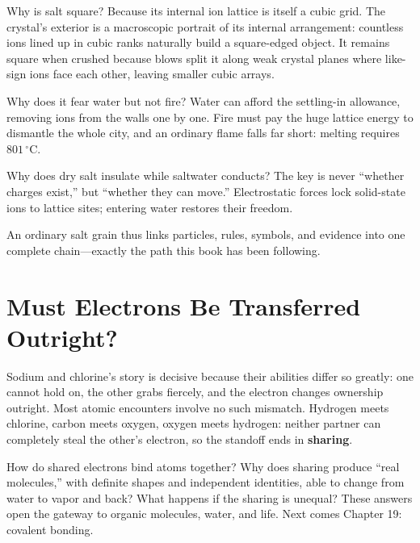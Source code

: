Why is salt square? Because its internal ion lattice is itself a cubic grid. The crystal's exterior is a macroscopic portrait of its internal arrangement: countless ions lined up in cubic ranks naturally build a square-edged object. It remains square when crushed because blows split it along weak crystal planes where like-sign ions face each other, leaving smaller cubic arrays.

Why does it fear water but not fire? Water can afford the settling-in allowance, removing ions from the walls one by one. Fire must pay the huge lattice energy to dismantle the whole city, and an ordinary flame falls far short: melting requires $801\,^{\circ}\mathrm{C}$.

Why does dry salt insulate while saltwater conducts? The key is never ``whether charges exist,'' but ``whether they can move.'' Electrostatic forces lock solid-state ions to lattice sites; entering water restores their freedom.

An ordinary salt grain thus links particles, rules, symbols, and evidence into one complete chain---exactly the path this book has been following.

\section{Must Electrons Be Transferred Outright?}

Sodium and chlorine's story is decisive because their abilities differ so greatly: one cannot hold on, the other grabs fiercely, and the electron changes ownership outright. Most atomic encounters involve no such mismatch. Hydrogen meets chlorine, carbon meets oxygen, oxygen meets hydrogen: neither partner can completely steal the other's electron, so the standoff ends in \textbf{sharing}.

How do shared electrons bind atoms together? Why does sharing produce ``real molecules,'' with definite shapes and independent identities, able to change from water to vapor and back? What happens if the sharing is unequal? These answers open the gateway to organic molecules, water, and life. Next comes Chapter 19: covalent bonding.

